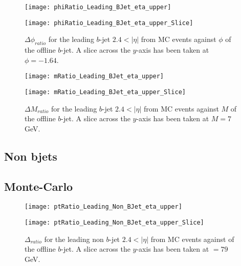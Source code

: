 		\begin{figure}[h]
			\centering

			\begin{minipage}[h]{0.33\linewidth}
				\texttt{[image: phiRatio\_Leading\_BJet\_eta\_upper]}
			\end{minipage}
			\quad
			\begin{minipage}[h]{0.33\linewidth}
				\texttt{[image: phiRatio\_Leading\_BJet\_eta\_upper\_Slice]}
			\end{minipage}
			\caption{$\Delta \phi_{ratio}$ for the leading \pt $b$-jet $2.4 < |\eta|$ from MC events against $\phi$ of the offline $b$-jet. A slice across the $y$-axis has been taken at $\phi=-1.64$. }
			\label{fig:MC:leadingbphiforward}
		\end{figure}

		\begin{figure}[h]
			\centering

			\begin{minipage}[h]{0.33\linewidth}
				\texttt{[image: mRatio\_Leading\_BJet\_eta\_upper]}
			\end{minipage}
			\quad
			\begin{minipage}[h]{0.33\linewidth}
				\texttt{[image: mRatio\_Leading\_BJet\_eta\_upper\_Slice]}
			\end{minipage}
			\caption{$\Delta M_{ratio}$ for the leading \pt $b$-jet $2.4 < |\eta|$ from MC events against $M$ of the offline $b$-jet. A slice across the $y$-axis has been taken at $M=7$GeV. }
			\label{fig:MC:leadingbmforward}
		\end{figure}

		\subsection{Non bjets}

		\subsection{Monte-Carlo}

		\begin{figure}[h]
			\centering
			\begin{minipage}[h]{0.33\linewidth}
				\texttt{[image: ptRatio\_Leading\_Non\_BJet\_eta\_upper]}

			\end{minipage}
			\quad
			\begin{minipage}[h]{0.33\linewidth}
				\texttt{[image: ptRatio\_Leading\_Non\_BJet\_eta\_upper\_Slice]}
			\end{minipage}
			\caption{$\Delta $\pt$_{ratio}$ for the leading \pt non $b$-jet $2.4 < |\eta|$ from MC events against \pt of the offline $b$-jet. A slice across the $y$-axis has been taken at \pt$=79$GeV. }
			\label{fig:MC:leadingnonbptforward}
		\end{figure}

